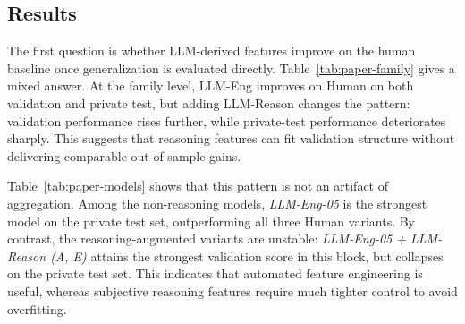 \documentclass{article}
\theoremstyle{plain}
\theoremstyle{definition}
\theoremstyle{remark}
\begin{document}
\subsection{Results}
The first question is whether LLM-derived features improve on the human baseline once generalization is evaluated directly. Table~\ref{tab:paper-family} gives a mixed answer. At the family level, LLM-Eng improves on Human on both validation and private test, but adding LLM-Reason changes the pattern: validation performance rises further, while private-test performance deteriorates sharply. This suggests that reasoning features can fit validation structure without delivering comparable out-of-sample gains.

\begin{table}[t]
\centering
\small
{}
\caption{Part 1 family-level validation vs private-test.}
\label{tab:paper-family}
\end{table}

Table~\ref{tab:paper-models} shows that this pattern is not an artifact of aggregation. Among the non-reasoning models, \textit{LLM-Eng-05} is the strongest model on the private test set, outperforming all three Human variants. By contrast, the reasoning-augmented variants are unstable: \textit{LLM-Eng-05 + LLM-Reason (A, E)} attains the strongest validation score in this block, but collapses on the private test set. This indicates that automated feature engineering is useful, whereas subjective reasoning features require much tighter control to avoid overfitting.
\end{document}
